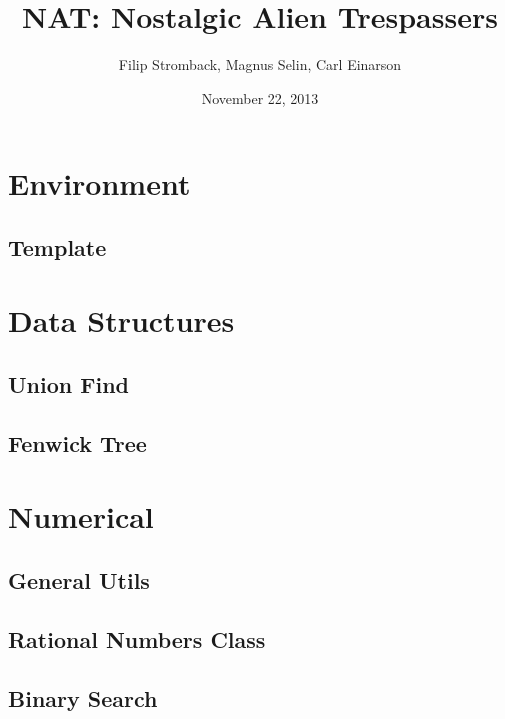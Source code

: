 \documentclass[a4paper]{article}
\title{NAT: Nostalgic Alien Trespassers}
\date{November 22, 2013}
\author{Filip Stromback, Magnus Selin, Carl Einarson}
\begin{document}
\maketitle
\begin{multicols}{2}
\tableofcontents
\end{multicols}
\newpage
\scriptsize



\begin{multicols}{3}

\section{Environment}
\subsection{Template}


\section{Data Structures}
\subsection{Union Find}



\subsection{Fenwick Tree}


\section{Numerical}

\subsection{General Utils}


\subsection{Rational Numbers Class}


\subsection{Binary Search}



\end{multicols}
\end{document}
